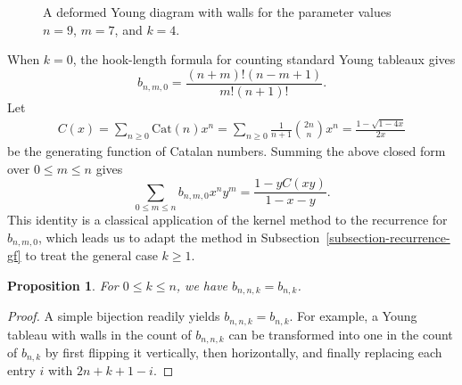\documentclass[reqno, 12pt]{article}
\newtheorem{prop}[thm]{Proposition}
\theoremstyle{mydefinition}
\theoremstyle{myremark}
\numberwithin{algorithm}{section}
\begin{document}
\begin{figure}[htbp]
\centering
{}
\caption{A deformed Young diagram with walls for the parameter values $n=9$, $m=7$, and $k=4$.}
\label{tab:bnmk}
\end{figure}


When $k=0$, the hook-length formula \cite[Corollary 7.21.6]{RP.Stanley2024} for counting standard Young tableaux gives
$$b_{n,m,0}=\frac{(n+m)!(n-m+1)}{m!(n+1)!}.$$
Let
\begin{align*}
C(x)=\sum_{n\geq 0}\mathrm{Cat}(n) x^n=\sum_{n\geq 0}\frac{1}{n+1}\binom{2n}{n} x^n=\frac{1-\sqrt{1-4x}}{2x}
\end{align*}
be the generating function of Catalan numbers.
Summing the above closed form over $0\le m\le n$ gives
$$\sum_{0\leq m\leq n}b_{n,m,0}x^ny^m=\frac{1-yC(xy)}{1-x-y}.$$
This identity is a classical application of the kernel method to the recurrence for $b_{n,m,0}$, which leads us to adapt the method in Subsection~\ref{subsection-recurrence-gf} to treat the general case $k\ge 1$.

\begin{prop}\label{prop:bnnk}
For $0\leq k\leq n$, we have $b_{n,n,k}=b_{n,k}$.
\end{prop}
\begin{proof}
A simple bijection readily yields $b_{n,n,k}=b_{n,k}$.
For example, a Young tableau with walls in the count of $b_{n,n,k}$ can be transformed into one in the count of $b_{n,k}$ by first flipping it vertically, then horizontally, and finally replacing each entry $i$ with $2n+k+1-i$.
\end{proof}
\end{document}
